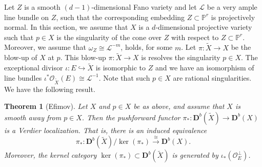 \documentclass[a4paper,11pt, reqno]{amsart}
\def\P{\mathbb P}
\def\DD{\mathbf D}
\def\OO{\mathcal O}
\def\sL{\mathscr{L}}
\def\Db{\DD^b}
\theoremstyle{plain}
\newtheorem{theorem}[dummy]{Theorem}
\theoremstyle{definition}
\numberwithin{equation}{section}
\newlength{\arrow}
\begin{document}
Let $Z$ is a smooth $(d-1)$-dimensional Fano variety and let $\sL$ be a very ample line bundle on $Z$, such that the corresponding embedding $Z\subset \P^r$ is projectively normal.
In this section, we assume that $X$ is a $d$-dimensional projective variety such that $p \in X$ is the singularity of the cone over $Z$ with respect to  $Z\subset \P^r$.
Moreover, we assume that $\omega_Z \cong \sL^{-m}$, holds, for some $m$.
Let $\pi : \tilde{X} \to X$ be the blow-up of $X$ at $p$.
This blow-up $\pi\colon \tilde{X} \to X$ is resolves the singularity $p\in X$.
The exceptional divisor $\iota \colon E \hookrightarrow \tilde{X}$ is isomorphic to $Z$ and we have an isomorphism of line bundles $\iota^\ast \OO_{\tilde{X}} (E) \cong \sL^{-1}$.
Note that such $p\in X$ are rational singularities.
We have the following result.



\begin{theorem}[Efimov]\label{thm:bo-localization-and-kernel}
    Let $X$ and  $p \in X$ be as above, and assume that $X$ is smooth away from $p \in X$. 
    Then the pushforward functor $\pi_\ast : \Db (\tilde{X}) \to \Db(X)$ is a Verdier localization.
    That is, there is an induced equivalence 
    \[
    \pi_\ast \colon \Db ( \tilde{X}) / \ker ( \pi_\ast ) \xrightarrow{\cong} \Db(X) .
    \]
    Moreover, the kernel category $\ker ( \pi_\ast ) \subset \Db(\tilde{X}) $ is generated by $\iota_\ast (\OO_E^{\perp})$. 
\end{theorem}
\end{document}
